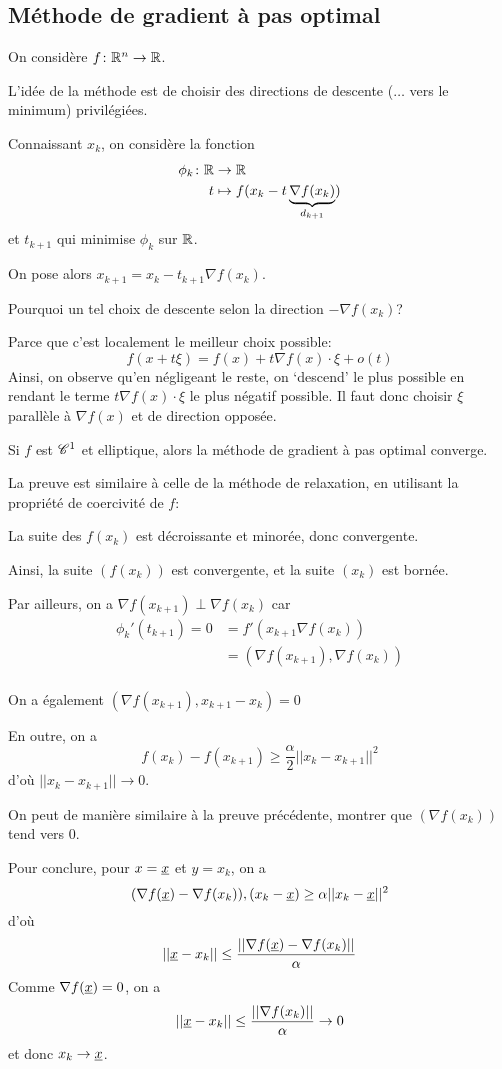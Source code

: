 \documentclass[french,a4paper,10pt]{article}
\begin{document}
	\subsection{Méthode de gradient à pas optimal}

	On considère $f\colon \mathbb{R}^n\to\mathbb{R}$.

	L'idée de la méthode est de choisir des directions de descente ($\dots$ vers le minimum) privilégiées.

	Connaissant $x_k$, on considère la fonction
	\[\begin{aligned}
		\phi_k\colon \mathbb{R}&\to\mathbb{R}\\
		t&\mapsto f(x_k-t\underbrace{\nabla f(x_k)}_{d_{k+1}})
	\end{aligned}\]
	et $t_{k+1}$ qui minimise $\phi_k$ sur $\mathbb{R}$.

	On pose alors $x_{k+1}=x_k-t_{k+1}\nabla f(x_k)$.

	Pourquoi un tel choix de descente selon la direction $-\nabla f(x_k)$?

	Parce que c'est localement le meilleur choix possible:
	\[
		f(x+t\xi)=f(x)+t\nabla f(x)\cdot \xi + o(t)
	\]
	Ainsi, on observe qu'en négligeant le reste, on `descend' le plus possible
	en rendant le terme $t\nabla f(x)\cdot \xi$ le plus négatif possible.
	Il faut donc choisir $\xi$ parallèle à $\nabla f(x)$ et de direction opposée.

	\begin{oc-theorem}
		Si $f$ est $\mathscr{C}^1$ et elliptique, alors la méthode de gradient à pas optimal converge.
	\end{oc-theorem}

	\begin{myproof}
		La preuve est similaire à celle de la méthode de relaxation, en utilisant
		la propriété de coercivité de $f$:

		La suite des $f(x_k)$ est décroissante et minorée, donc convergente.

		Ainsi, la suite $(f(x_k))$ est convergente, et la suite $(x_k)$ est bornée.

		Par ailleurs, on a $\nabla f(x_{k+1})\perp \nabla f(x_k)$ car
		\[\begin{aligned}
			\phi_k'(t_{k+1})=0&=f'(x_{k+1}\nabla f(x_k))\\
			&=(\nabla f(x_{k+1}), \nabla f(x_k))\\
		\end{aligned}\]

		On a également $(\nabla f(x_{k+1}), x_{k+1}-x_k)= 0$

		En outre, on a
		\[
			f(x_k)-f(x_{k+1})\geq \frac{\alpha}{2}||x_k-x_{k+1}||^2
		\]
		d'où $||x_k-x_{k+1}||\to 0$.

		On peut de manière similaire à la preuve précédente,
		montrer que $(\nabla f(x_k))$ tend vers 0.

		Pour conclure, pour $x=\underline{x}$ et $y=x_k$, on a
		\[
			(\nabla f(\underline{x})-\nabla f(x_k)),(x_k-\underline{x})\geq \alpha||x_k-\underline{x}||^2
		\]
		d'où
		\[
			||\underline{x}-x_k||\leq \frac{||\nabla f(\underline{x}) - \nabla f(x_k)||}{\alpha}
		\]
		Comme $\nabla f(\underline{x})=0$, on a
		\[
			||\underline{x}-x_k||\le \frac{||\nabla f(x_k)||}{\alpha}\to 0
		\]
		et donc $x_k\to \underline{x}$.
	\end{myproof}
\end{document}
